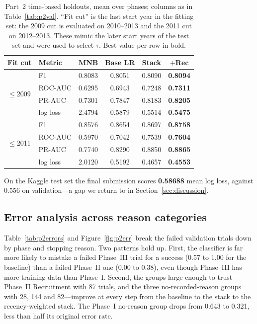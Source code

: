 \begin{table}[t]
\centering\small
\setlength{\tabcolsep}{3.5pt}
\begin{tabular}{llcccc}
\toprule
Fit cut & Metric & MNB & Base LR & Stack & $+$Rec \\
\midrule
\multirow{4}{*}{$\leq$2009}
 & F1       & 0.8083 & 0.8051 & 0.8090 & \textbf{0.8094} \\
 & ROC-AUC  & 0.6295 & 0.6943 & 0.7248 & \textbf{0.7311} \\
 & PR-AUC   & 0.7301 & 0.7847 & 0.8183 & \textbf{0.8205} \\
 & log loss & 2.4794 & 0.5879 & 0.5514 & \textbf{0.5475} \\
\midrule
\multirow{4}{*}{$\leq$2011}
 & F1       & 0.8576 & 0.8654 & 0.8697 & \textbf{0.8758} \\
 & ROC-AUC  & 0.5970 & 0.7042 & 0.7539 & \textbf{0.7604} \\
 & PR-AUC   & 0.7740 & 0.8290 & 0.8850 & \textbf{0.8865} \\
 & log loss & 2.0120 & 0.5192 & 0.4657 & \textbf{0.4553} \\
\bottomrule
\end{tabular}
\caption{Part~2 time-based holdouts, mean over phases; columns as in
Table~\ref{tab:p2val}. ``Fit cut'' is the last start year in the fitting set: the
2009 cut is evaluated on 2010--2013 and the 2011 cut on 2012--2013. These mimic the later start years of the test set and were used to
select $\tau$. Best value per row in bold.}
\label{tab:p2holdout}
\end{table}

On the Kaggle test set the final submission scores \textbf{0.58688} mean log
loss, against 0.556 on validation---a gap we return to in
Section~\ref{sec:discussion}.

\subsection{Error analysis across reason categories}

Table~\ref{tab:p2errors} and Figure~\ref{fig:p2err} break the failed validation
trials down by phase and stopping reason. Two patterns hold up. First, the
classifier is far more likely to mistake a failed Phase~III trial for a success
(0.57 to 1.00 for the baseline) than a failed Phase~II one (0.00 to 0.38), even
though Phase~III has more training data than Phase~I. Second, the groups large
enough to trust---Phase~II Recruitment with 87 trials, and the three
no-recorded-reason groups with 28, 144 and 82---improve at every step from the
baseline to the stack to the recency-weighted stack. The Phase~I no-reason group
drops from 0.643 to 0.321, less than half its original error rate.

